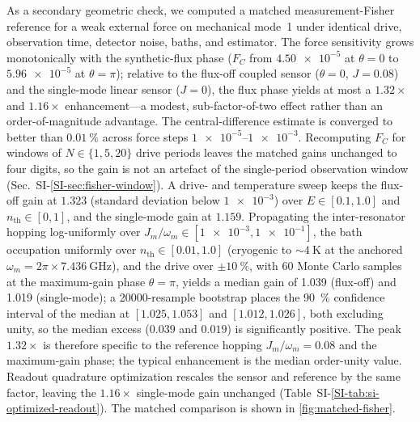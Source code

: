 \documentclass[Phys]{SciPost}
\begin{document}
As a secondary geometric check, we computed a matched measurement-Fisher reference for a weak external force on mechanical mode~1 under identical drive, observation time, detector noise, baths, and estimator. The force sensitivity grows monotonically with the synthetic-flux phase ($F_C$ from $\num{4.50e-5}$ at $\theta=0$ to $\num{5.96e-5}$ at $\theta=\pi$); relative to the flux-off coupled sensor ($\theta=0$, $J=\num{0.08}$) and the single-mode linear sensor ($J=0$), the flux phase yields at most a $\num{1.32}\times$ and $\num{1.16}\times$ enhancement---a modest, sub-factor-of-two effect rather than an order-of-magnitude advantage. The central-difference estimate is converged to better than $\qty{0.01}{\percent}$ across force steps $\num{1e-5}$--$\num{1e-3}$. Recomputing $F_C$ for windows of $N\in\{1,5,20\}$ drive periods leaves the matched gains unchanged to four digits, so the gain is not an artefact of the single-period observation window (Sec.~SI-\ref{SI-sec:fisher-window}). A drive- and temperature sweep keeps the flux-off gain at $\num{1.323}$ (standard deviation below $\num{1e-3}$) over $E\in[\num{0.1},\num{1.0}]$ and $n_{\mathrm{th}}\in[0,1]$, and the single-mode gain at $\num{1.159}$. Propagating the inter-resonator hopping log-uniformly over $J_m/\omega_m\in[\num{1e-3},\num{1e-1}]$, the bath occupation uniformly over $n_{\mathrm{th}}\in[\num{0.01},\num{1.0}]$ (cryogenic to $\sim\num{4}~\si{\kelvin}$ at the anchored $\omega_m=2\pi\times\num{7.436}~\si{\giga\hertz}$), and the drive over $\pm\qty{10}{\percent}$, with \num{60} Monte Carlo samples at the maximum-gain phase $\theta=\pi$, yields a median gain of \num{1.039} (flux-off) and \num{1.019} (single-mode); a \num{20000}-resample bootstrap places the \qty{90}{\percent} confidence interval of the median at $[\num{1.025},\num{1.053}]$ and $[\num{1.012},\num{1.026}]$, both excluding unity, so the median excess ($\num{0.039}$ and $\num{0.019}$) is significantly positive. The peak $\num{1.32}\times$ is therefore specific to the reference hopping $J_m/\omega_m=\num{0.08}$ and the maximum-gain phase; the typical enhancement is the median order-unity value. Readout quadrature optimization rescales the sensor and reference by the same factor, leaving the $\num{1.16}\times$ single-mode gain unchanged (Table~SI-\ref{SI-tab:si-optimized-readout}). The matched comparison is shown in \cref{fig:matched-fisher}.
\end{document}
